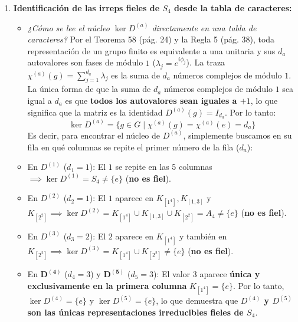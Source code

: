 \documentclass[11pt, a4paper]{article}
\begin{document}
\begin{enumerate}
    \item \textbf{Identificación de las irreps fieles de $S_4$ desde la tabla de caracteres:}
    \begin{itemize}
        \item \textit{¿Cómo se lee el núcleo $\ker D^{(a)}$ directamente en una tabla de caracteres?}
        Por el Teorema 58 (pág. 24) y la Regla 5 (pág. 38), toda representación de un grupo finito es equivalente a una unitaria y sus $d_a$ autovalores son fases de módulo $1$ ($\lambda_j = e^{i\phi_j}$). La traza $\chi^{(a)}(g) = \sum_{j=1}^{d_a} \lambda_j$ es la suma de $d_a$ números complejos de módulo $1$. La única forma de que la suma de $d_a$ números complejos de módulo $1$ sea igual a $d_a$ es que \textbf{todos los autovalores sean iguales a $+1$}, lo que significa que la matriz es la identidad $D^{(a)}(g) = I_{d_a}$. Por lo tanto:
        \[
        \ker D^{(a)} = \big\{ g \in G \;\big|\; \chi^{(a)}(g) = \chi^{(a)}(e) = d_a \big\}
        \]
        Es decir, para encontrar el núcleo de $D^{(a)}$, simplemente buscamos en su fila en qué columnas se repite el primer número de la fila ($d_a$):
        \item En $D^{(1)}$ ($d_1 = 1$): El $1$ se repite en las 5 columnas $\implies \ker D^{(1)} = S_4 \neq \{e\}$ (\textbf{no es fiel}).
        \item En $D^{(2)}$ ($d_2 = 1$): El $1$ aparece en $K_{[1^4]}, K_{[1, 3]}$ y $K_{[2^2]} \implies \ker D^{(2)} = K_{[1^4]} \cup K_{[1, 3]} \cup K_{[2^2]} = A_4 \neq \{e\}$ (\textbf{no es fiel}).
        \item En $D^{(3)}$ ($d_3 = 2$): El $2$ aparece en $K_{[1^4]}$ y también en $K_{[2^2]} \implies \ker D^{(3)} = K_{[1^4]} \cup K_{[2^2]} \neq \{e\}$ (\textbf{no es fiel}).
        \item En $\mathbf{D^{(4)}}$ ($d_4 = 3$) y $\mathbf{D^{(5)}}$ ($d_5 = 3$): El valor $3$ aparece \textbf{única y exclusivamente en la primera columna} $K_{[1^4]} = \{e\}$. Por lo tanto, $\ker D^{(4)} = \{e\}$ y $\ker D^{(5)} = \{e\}$, lo que demuestra que \textbf{$D^{(4)}$ y $D^{(5)}$ son las únicas representaciones irreducibles fieles de $S_4$}.
    \end{itemize}
\end{enumerate}
\end{document}
